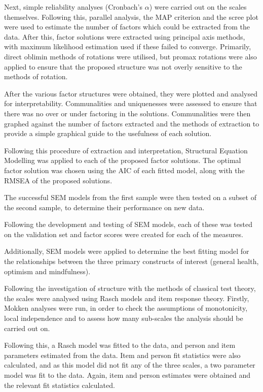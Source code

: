 \documentclass{article}
\begin{document}
Next, simple reliability analyses (Cronbach's $\alpha$) were carried out on the scales themselves. Following this, parallel analysis, the MAP criterion and the scree plot were used to estimate the number of factors which could be extracted from the data. After this, factor solutions were extracted using principal axis methods, with maximum likelihood estimation used if these failed to converge. Primarily, direct oblimin methods of rotations were utilised, but promax rotations were also applied to ensure that the proposed structure was not overly sensitive to the methods of rotation.

After the various factor structures were obtained, they were plotted and analysed for interpretability. Communalities and uniquenesses were assessed to ensure that there was no over or under factoring in the solutions. Communalities were then graphed against the number of factors extracted and the methods of extraction to provide a simple graphical guide to the usefulness of each solution.

Following this procedure of extraction and interpretation, Structural Equation Modelling was applied to each of the proposed factor solutions. The optimal factor solution was chosen using the AIC of each fitted model, along with the RMSEA of the proposed solutions.

The successful SEM models from the first sample were then tested on a subset of the second sample, to determine their performance on new data. 

Following the development and testing of SEM models, each of these was tested on the validation set and factor scores were created for each of the measures.

Additionally, SEM models were applied to determine the best fitting model for the relationships between the three primary constructs of interest (general health, optimism and mindfulness). 

Following the investigation of structure with the methods of classical test theory, the scales were analysed using Rasch models and item response theory. Firstly, Mokken analyses  were run, in order to check the assumptions of monotonicity, local independence and to assess how many sub-scales the analysis should be carried out on. 

Following this, a Rasch model was fitted to the data, and person and item parameters estimated from the data. Item and person fit statistics were also calculated, and as this model did not fit any of the three scales, a two parameter model was fit to the data. Again, item and person estimates were obtained and the relevant fit statistics calculated. 
\end{document}
